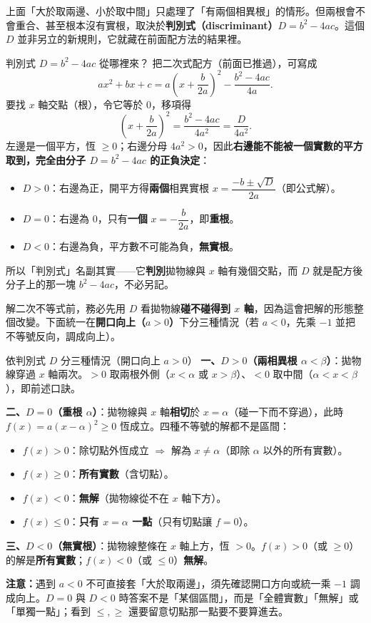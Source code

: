 \documentclass[11pt]{article}
\begin{document}
上面「大於取兩邊、小於取中間」只處理了「有兩個相異根」的情形。但兩根會不會重合、甚至根本沒有實根，取決於\textbf{判別式（discriminant）$D=b^2-4ac$}。這個 $D$ 並非另立的新規則，它就藏在前面配方法的結果裡。

\begin{補充框}{判別式 $D=b^2-4ac$ 從哪裡來？}
把二次式配方（前面已推過），可寫成
$$ax^2+bx+c=a\left(x+\frac{b}{2a}\right)^2-\frac{b^2-4ac}{4a}.$$
要找 $x$ 軸交點（根），令它等於 $0$，移項得
$$\left(x+\frac{b}{2a}\right)^2=\frac{b^2-4ac}{4a^2}=\frac{D}{4a^2}.$$
左邊是一個平方，恆 $\ge 0$；右邊分母 $4a^2>0$，因此\textbf{右邊能不能被一個實數的平方取到，完全由分子 $D=b^2-4ac$ 的正負決定}：
\begin{itemize}\setlength{\itemsep}{1pt}
\item $D>0$：右邊為正，開平方得\textbf{兩個}相異實根 $x=\dfrac{-b\pm\sqrt{D}}{2a}$（即公式解）。
\item $D=0$：右邊為 $0$，只有\textbf{一個} $x=-\dfrac{b}{2a}$，即\textbf{重根}。
\item $D<0$：右邊為負，平方數不可能為負，\textbf{無實根}。
\end{itemize}
所以「判別式」名副其實——它\textbf{判別}拋物線與 $x$ 軸有幾個交點，而 $D$ 就是配方後分子上的那一塊 $b^2-4ac$，不必另記。
\end{補充框}

解二次不等式前，務必先用 $D$ 看拋物線\textbf{碰不碰得到 $x$ 軸}，因為這會把解的形態整個改變。下面統一在\textbf{開口向上（$a>0$）}下分三種情況（若 $a<0$，先乘 $-1$ 並把不等號反向，調成向上）。

\begin{補充框}{依判別式 $D$ 分三種情況（開口向上 $a>0$）}
\textbf{一、$D>0$（兩相異根 $\alpha<\beta$）}：拋物線穿過 $x$ 軸兩次。$>0$ 取兩根外側（$x<\alpha$ 或 $x>\beta$）、$<0$ 取中間（$\alpha<x<\beta$），即前述口訣。

\textbf{二、$D=0$（重根 $\alpha$）}：拋物線與 $x$ 軸\textbf{相切}於 $x=\alpha$（碰一下而不穿過），此時 $f(x)=a(x-\alpha)^2\ge 0$ 恆成立。四種不等號的解都不是區間：
\begin{itemize}\setlength{\itemsep}{1pt}
\item $f(x)>0$：除切點外恆成立 $\Rightarrow$ 解為 $x\neq\alpha$（即除 $\alpha$ 以外的所有實數）。
\item $f(x)\ge 0$：\textbf{所有實數}（含切點）。
\item $f(x)<0$：\textbf{無解}（拋物線從不在 $x$ 軸下方）。
\item $f(x)\le 0$：\textbf{只有 $x=\alpha$ 一點}（只有切點讓 $f=0$）。
\end{itemize}

\textbf{三、$D<0$（無實根）}：拋物線整條在 $x$ 軸上方，恆 $>0$。$f(x)>0$（或 $\ge 0$）的解是\textbf{所有實數}；$f(x)<0$（或 $\le 0$）\textbf{無解}。

\textbf{注意：}遇到 $a<0$ 不可直接套「大於取兩邊」，須先確認開口方向或統一乘 $-1$ 調成向上。$D=0$ 與 $D<0$ 時答案不是「某個區間」，而是「全體實數」「無解」或「單獨一點」；看到 $\le,\ge$ 還要留意切點那一點要不要算進去。
\end{補充框}
\end{document}

